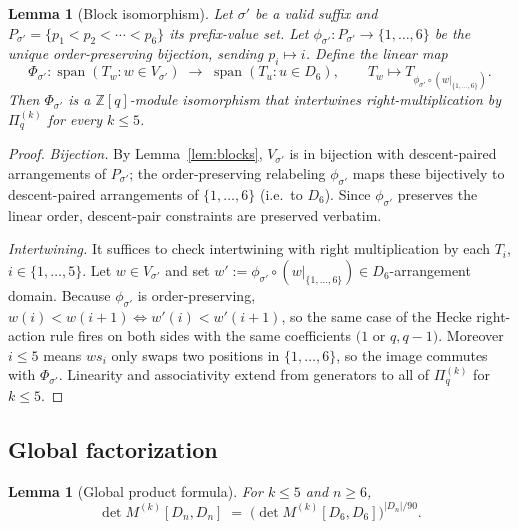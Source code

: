 \documentclass[11pt]{article}
\newtheorem{lemma}[theorem]{Lemma}
\theoremstyle{definition}
\begin{document}
\begin{lemma}[Block isomorphism]
\label{lem:iso}
Let $\sigma'$ be a valid suffix and $P_{\sigma'} = \{p_1 < p_2 < \cdots < p_6\}$
its prefix-value set. Let $\phi_{\sigma'} : P_{\sigma'} \to \{1, \ldots, 6\}$
be the unique order-preserving bijection, sending $p_i \mapsto i$. Define
the linear map
\[
\Phi_{\sigma'} : \operatorname{span}(T_w : w \in V_{\sigma'}) \;\longrightarrow\;
\operatorname{span}(T_u : u \in D_6),
\qquad T_w \mapsto T_{\phi_{\sigma'} \circ (w|_{\{1,\ldots,6\}})}.
\]
Then $\Phi_{\sigma'}$ is a $\mathbb{Z}[q]$-module isomorphism that intertwines
right-multiplication by $\Pi^{(k)}_q$ for every $k \leq 5$.
\end{lemma}

\begin{proof}
\emph{Bijection.} By Lemma~\ref{lem:blocks}, $V_{\sigma'}$ is in bijection with
descent-paired arrangements of $P_{\sigma'}$; the order-preserving
relabeling $\phi_{\sigma'}$ maps these bijectively to descent-paired
arrangements of $\{1, \ldots, 6\}$ (i.e.\ to $D_6$). Since $\phi_{\sigma'}$
preserves the linear order, descent-pair constraints are preserved verbatim.

\emph{Intertwining.} It suffices to check intertwining with right multiplication
by each $T_i$, $i \in \{1, \ldots, 5\}$. Let $w \in V_{\sigma'}$ and set
$w' := \phi_{\sigma'} \circ (w|_{\{1,\ldots,6\}}) \in D_6$-arrangement domain.
Because $\phi_{\sigma'}$ is order-preserving,
$w(i) < w(i+1) \iff w'(i) < w'(i+1)$,
so the same case of the Hecke right-action rule fires on both sides with the
same coefficients $(1$ or $q, q-1)$. Moreover $i \leq 5$ means $ws_i$ only
swaps two positions in $\{1, \ldots, 6\}$, so the image commutes with
$\Phi_{\sigma'}$. Linearity and associativity extend from generators to all of
$\Pi^{(k)}_q$ for $k \leq 5$.
\end{proof}

\subsection{Global factorization}

\begin{lemma}[Global product formula]
\label{lem:global}
For $k \leq 5$ and $n \geq 6$,
\[
\det M^{(k)}[D_n, D_n] \;=\; \bigl( \det M^{(k)}[D_6, D_6] \bigr)^{|D_n|/90}.
\]
\end{lemma}
\end{document}
